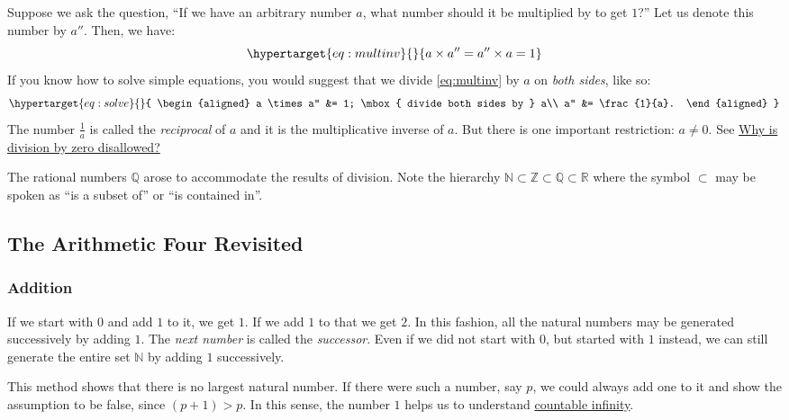 \documentclass[
  a4paper,
]{article}
\begin{document}
Suppose we ask the question, ``If we have an arbitrary number \(a\),
what number should it be multiplied by to get \(1\)?'' Let us denote
this number by \(a''\). Then, we have:
\begin{equation}\protect\hypertarget{eq:multinv}{}{
a \times a'' = a'' \times a = 1
}\label{eq:multinv}\end{equation} If you know how to solve simple
equations, you would suggest that we divide \cref{eq:multinv} by \(a\)
on \emph{both sides}, like so:
\begin{equation}\protect\hypertarget{eq:solve}{}{
\begin{aligned}
a \times a'' &= 1; \mbox{ divide both sides by } a\\
a'' &= \frac{1}{a}.
\end{aligned}
}\label{eq:solve}\end{equation} The number \(\frac{1}{a}\) is called the
\emph{reciprocal} of \(a\) and it is the multiplicative inverse of
\(a\). But there is one important restriction: \(a \ne 0\). See
\protect\hyperlink{why-is-division-by-zero-disallowed}{Why is division
by zero disallowed?}

The rational numbers \(\mathbb{Q}\) arose to accommodate the results of
division. Note the hierarchy
\(\mathbb{N} \subset \mathbb{Z} \subset \mathbb{Q} \subset \mathbb{R}\)
where the symbol \(\subset\) may be spoken as ``is a subset of'' or ``is
contained in''.

\hypertarget{the-arithmetic-four-revisited}{%
\subsection{The Arithmetic Four
Revisited}\label{the-arithmetic-four-revisited}}

\hypertarget{addition}{%
\subsubsection{Addition}\label{addition}}

If we start with \(0\) and add \(1\) to it, we get \(1\). If we add
\(1\) to that we get \(2\). In this fashion, all the natural numbers may
be generated successively by adding \(1\). The \emph{next number} is
called the \emph{successor}. Even if we did not start with \(0\), but
started with \(1\) instead, we can still generate the entire set
\(\mathbb{N}\) by adding \(1\) successively.

This method shows that there is no largest natural number. If there were
such a number, say \(p\), we could always add one to it and show the
assumption to be false, since \((p + 1) > p\). In this sense, the number
\(1\) helps us to understand
\href{https://mathinsight.org/definition/countably_infinite}{countable
infinity}.
\end{document}

